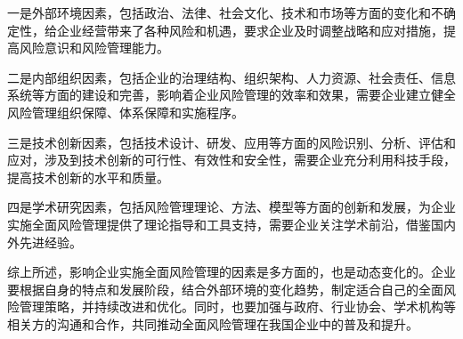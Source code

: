 \documentclass[a4paper,12pt]{ctexart}
\begin{document}
一是外部环境因素，包括政治、法律、社会文化、技术和市场等方面的变化和不确定性，给企业经营带来了各种风险和机遇，要求企业及时调整战略和应对措施，提高风险意识和风险管理能力。

二是内部组织因素，包括企业的治理结构、组织架构、人力资源、社会责任、信息系统等方面的建设和完善，影响着企业风险管理的效率和效果，需要企业建立健全风险管理组织保障、体系保障和实施程序。

三是技术创新因素，包括技术设计、研发、应用等方面的风险识别、分析、评估和应对，涉及到技术创新的可行性、有效性和安全性，需要企业充分利用科技手段，提高技术创新的水平和质量。

四是学术研究因素，包括风险管理理论、方法、模型等方面的创新和发展，为企业实施全面风险管理提供了理论指导和工具支持，需要企业关注学术前沿，借鉴国内外先进经验。

综上所述，影响企业实施全面风险管理的因素是多方面的，也是动态变化的。企业要根据自身的特点和发展阶段，结合外部环境的变化趋势，制定适合自己的全面风险管理策略，并持续改进和优化。同时，也要加强与政府、行业协会、学术机构等相关方的沟通和合作，共同推动全面风险管理在我国企业中的普及和提升。

\appendix
\nocite{*}
\printbibliography
\end{document}
